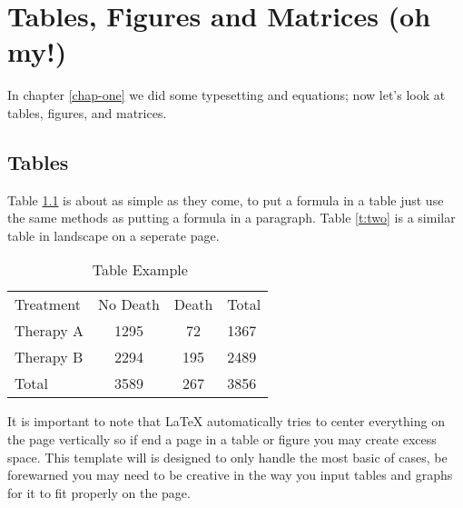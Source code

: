 \chapter{Tables, Figures and Matrices (oh my!)}
\label{chap-two}
In chapter \ref{chap-one} we did some typesetting and equations; now let's look at tables, figures, and matrices.

\section{Tables}
Table \ref{t:one} is about as simple as they come, to put a formula in a table just use the same methods as putting a formula in a paragraph.  Table \ref{t:two} is a similar table in landscape on a seperate page.  

\begin{table}
\caption{$ $ Table Example}
\label{t:one}
\begin{center}
\begin{tabular}{lccl}
\hline
Treatment & No Death & Death & Total\\
Therapy A & 1295 & 72 & 1367\\
Therapy B 	& 2294 & 195 & 2489\\
Total & 3589 & 267 & 3856\\
\hline
\end{tabular}
\end{center}
\end{table}

It is important to note that LaTeX automatically tries to center everything on the page vertically so if end a page in a table or figure you may create excess space.  This template will is designed to only handle the most basic of cases, be forewarned you may need to be creative in the way you input tables and graphs for it to fit properly on the page.  
\newpage
\thispagestyle{empty}

